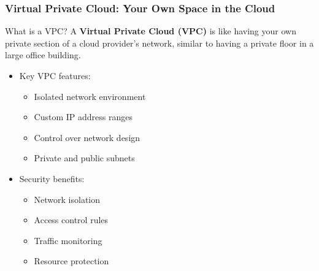 \documentclass{beamer}
\begin{document}
\begin{frame}
    \frametitle{Virtual Private Cloud: Your Own Space in the Cloud}
    
    \begin{alertblock}{What is a VPC?}
        A \textbf{Virtual Private Cloud (VPC)} is like having your own private section of a cloud provider's network, similar to having a private floor in a large office building.
    \end{alertblock}
    
    \begin{itemize}
        \item Key VPC features:
        \begin{itemize}
            \item Isolated network environment
            \item Custom IP address ranges
            \item Control over network design
            \item Private and public subnets
        \end{itemize}
        
        \item Security benefits:
        \begin{itemize}
            \item Network isolation
            \item Access control rules
            \item Traffic monitoring
            \item Resource protection
        \end{itemize}
    \end{itemize}
\end{frame}
\end{document}
